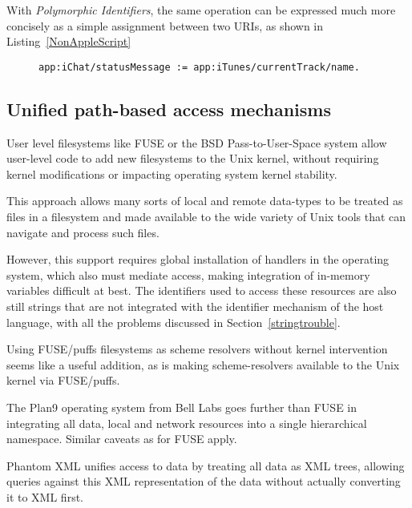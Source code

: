 \documentclass[preprint,authoryear]{llncs}
\begin{document}
With \emph{Polymorphic Identifiers}, the same operation can be expressed
much more concisely as a simple assignment between two URIs,
as shown in Listing~\ref{NonAppleScript}


\begin{figure}[htbp]
\begin{lstlisting}[style=L,label=NonAppleScript,caption=Access to applications via \emph{Polymorphic Identifiers}.]
  app:iChat/statusMessage := app:iTunes/currentTrack/name.
\end{lstlisting}
\end{figure}


\subsection{Unified path-based access mechanisms}


User level filesystems like FUSE\cite{fuse} or the BSD Pass-to-User-Space\cite{puffs} 
system allow
user-level code to add new filesystems to the Unix kernel, without requiring
kernel modifications or impacting operating system kernel stability.

This approach allows many sorts of local and remote data-types to be 
treated as files in a filesystem and made available to the wide variety
of Unix tools that can navigate and process such files.  

However, this support requires global installation of handlers in the operating
system, which also must mediate access, making integration of in-memory 
variables difficult at best.  The identifiers used to access these resources
are also still strings that are not integrated with the identifier mechanism of
the host language, with all the problems discussed in Section~\ref{stringtrouble}.

Using FUSE/puffs filesystems as scheme resolvers without kernel intervention seems
like a useful addition, as is making scheme-resolvers available to the Unix kernel
via FUSE/puffs.

The Plan9\cite{plan9names}\cite{plan9network} operating system from Bell Labs goes further than FUSE in integrating
all data, local and network resources into a single hierarchical namespace.  Similar
caveats as for FUSE apply.

Phantom XML\cite{phantomxml} unifies access to data by treating all data as
XML trees, allowing queries against this XML representation of the data without
actually converting it to XML first.  
\end{document}
